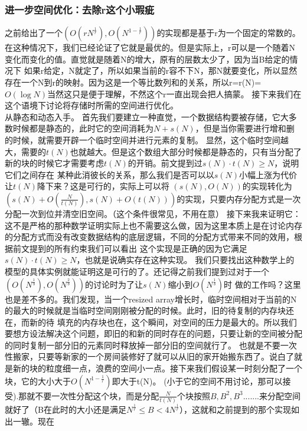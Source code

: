 \documentclass[12pt,a4paper]{article}
\begin{document}
\subsubsection{进一步空间优化：去除r这个小瑕疵}
之前给出了一个$(O(rN^{\frac{1}{r}}),O(N^{1-\frac{1}{r}}))$的实现都是基于r为一个固定的常数的。在这种情况下，我们已经论证了它就是最优的。但是实际上，r可以是一个随着N变化而变化的值。直觉就是随着N的增大，原有的层数太少了，因为当B给定的情况下
如果r给定，N就定了，所以如果当前的r容不下N，那N就要变化，所以显然存在一个N到r的映射。因为这是一个等比数列和的关系，所以r=r(N)=$O(\log N)$当然这只是便于理解，不然这个r一直出现会把人搞蒙。
接下来我们在这个语境下讨论将存储时所需的空间进行优化。\\
从静态和动态入手。
首先我们要建立一种直觉，一个数据结构要被存储，它大多数时候都是静态的，此时它的空间消耗为$N+s(N)$，但是当你需要进行增和删的时候，就需要开辟一个临时空间并进行元素的复制。
显然，这个临时空间越大，需要的$t(N)$也就越大。但是这个数组大部分时候都是静态的，只有当分配了新的块的时候它才需要考虑$t(N)$的开销。前文提到过$s(N)\cdot t(N)\ge N $，说明它们之间存在
某种此消彼长的关系，那么我们是否可以以$s(N)$小幅上涨为代价让$t(N)$降下来？这是可行的，实际上可以将
$(s(N),O(N))$的实现转化为$(s(N)+O(\frac{N}{t(N)}),s(N)+O(t(N)))$的实现，只要内存分配方式是一次分配一次到位并清空旧空间。（这个条件很常见，不用在意）
接下来我来证明它：\\
这不是严格的那种数学证明实际上也不需要这么做，因为这里本质上是在讨论内存的分配方式而没有改变数据结构的底层逻辑，不同的分配方式带来不同的效用，根据前文提到的所有约束我们可以看出
这个实现是正确的因为它满足$s(N)\cdot t(N)\ge N$，也就是说确实存在这种实现。
我们只要找出这种数学上的模型的具体实例就能证明这是可行的了。还记得之前我们提到过对于一个$(O(N^{\frac{1}{3}}),O(N^{\frac{2}{3}}))$的讨论时为了让$s(N)$缩小到$O(N^{\frac{1}{3}})$时
做的工作吗？这里也是差不多的。我们发现，当一个resized array增长时，临时空间相对于当前的N的最大的时候就是当临时空间刚刚被分配的时候。此时，旧的待复制的内存块还在，而新的待
填充的内存块也在，这个瞬间，对空间的压力是最大的。所以我们要想方设法解决这个问题，即旧的和新的同时存在的问题，只要让新的空间被分配的同时复制一部分旧的元素同时释放掉一部分旧的空间就行了。
也就是不要一次性搬家，只要等新家的一个房间装修好了就可以从旧的家开始搬东西了。说白了就是新的块的粒度细一点，浪费的空间小一点。接下来我们假设某一时刻分配了一个块，它的大小大于$O(N^{1-\frac{1}{r}})$即大于t(N)。
(小于它的空间不用讨论，那可以接受).那就不要一次性分配这个块，而是分配$\frac{N}{t(N)}$个块按照$B,B^2,B^3.......$来分配空间就好了（B在此时的大小还是满足$ N^{\frac{1}{r}} ≤ B < 4N^{\frac{1}{r}}$），这就和之前提到的那个实现如出一辙。现在
\end{document}
